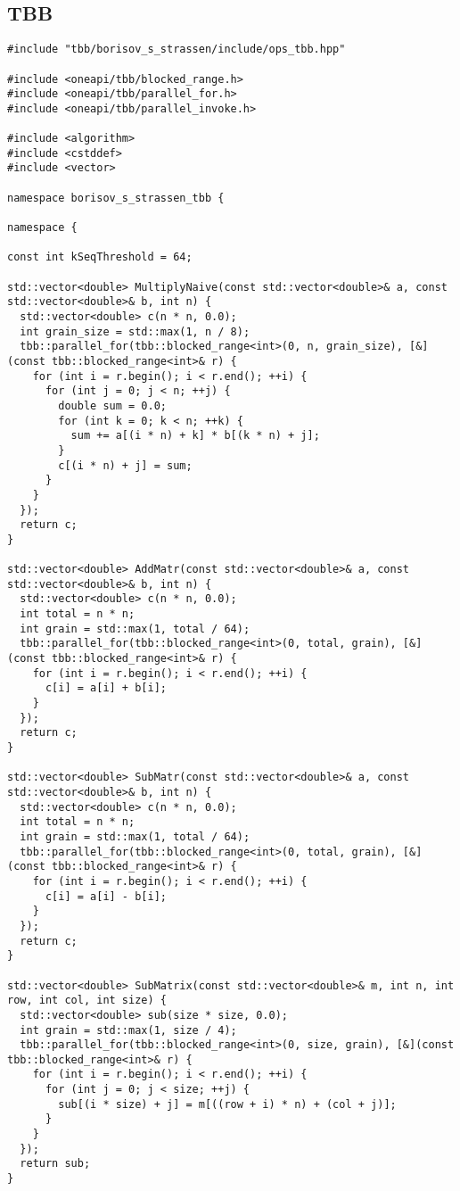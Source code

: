 \documentclass[12pt]{article}
\begin{document}
\subsection*{TBB}
\begin{lstlisting}
#include "tbb/borisov_s_strassen/include/ops_tbb.hpp"

#include <oneapi/tbb/blocked_range.h>
#include <oneapi/tbb/parallel_for.h>
#include <oneapi/tbb/parallel_invoke.h>

#include <algorithm>
#include <cstddef>
#include <vector>

namespace borisov_s_strassen_tbb {

namespace {

const int kSeqThreshold = 64;

std::vector<double> MultiplyNaive(const std::vector<double>& a, const std::vector<double>& b, int n) {
  std::vector<double> c(n * n, 0.0);
  int grain_size = std::max(1, n / 8);
  tbb::parallel_for(tbb::blocked_range<int>(0, n, grain_size), [&](const tbb::blocked_range<int>& r) {
    for (int i = r.begin(); i < r.end(); ++i) {
      for (int j = 0; j < n; ++j) {
        double sum = 0.0;
        for (int k = 0; k < n; ++k) {
          sum += a[(i * n) + k] * b[(k * n) + j];
        }
        c[(i * n) + j] = sum;
      }
    }
  });
  return c;
}

std::vector<double> AddMatr(const std::vector<double>& a, const std::vector<double>& b, int n) {
  std::vector<double> c(n * n, 0.0);
  int total = n * n;
  int grain = std::max(1, total / 64);
  tbb::parallel_for(tbb::blocked_range<int>(0, total, grain), [&](const tbb::blocked_range<int>& r) {
    for (int i = r.begin(); i < r.end(); ++i) {
      c[i] = a[i] + b[i];
    }
  });
  return c;
}

std::vector<double> SubMatr(const std::vector<double>& a, const std::vector<double>& b, int n) {
  std::vector<double> c(n * n, 0.0);
  int total = n * n;
  int grain = std::max(1, total / 64);
  tbb::parallel_for(tbb::blocked_range<int>(0, total, grain), [&](const tbb::blocked_range<int>& r) {
    for (int i = r.begin(); i < r.end(); ++i) {
      c[i] = a[i] - b[i];
    }
  });
  return c;
}

std::vector<double> SubMatrix(const std::vector<double>& m, int n, int row, int col, int size) {
  std::vector<double> sub(size * size, 0.0);
  int grain = std::max(1, size / 4);
  tbb::parallel_for(tbb::blocked_range<int>(0, size, grain), [&](const tbb::blocked_range<int>& r) {
    for (int i = r.begin(); i < r.end(); ++i) {
      for (int j = 0; j < size; ++j) {
        sub[(i * size) + j] = m[((row + i) * n) + (col + j)];
      }
    }
  });
  return sub;
}


\end{lstlisting}
\end{document}
